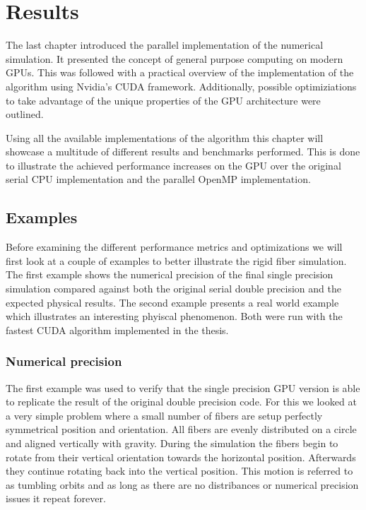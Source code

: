 \documentclass[a4paper,11pt]{kth-mag}
\begin{document}
\chapter{Results}
\label{cha:results}

The last chapter introduced the parallel implementation of the numerical simulation. It presented the concept of general purpose computing on modern GPUs. This was followed with a practical overview of the implementation of the algorithm using Nvidia's CUDA framework. Additionally, possible optimiziations to take advantage of the unique properties of the GPU architecture were outlined.

Using all the available implementations of the algorithm this chapter will showcase a multitude of different results and benchmarks performed. This is done to illustrate the achieved performance increases on the GPU over the original serial CPU implementation and the parallel OpenMP implementation.

\section{Examples}

Before examining the different performance metrics and optimizations we will first look at a couple of examples to better illustrate the rigid fiber simulation. The first example shows the numerical precision of the final single precision simulation compared against both the original serial double precision and the expected physical results. The second example presents a real world example which illustrates an interesting phyiscal phenomenon. Both were run with the fastest CUDA algorithm implemented in the thesis.

\subsection{Numerical precision}
\label{subsec:example_sphere}

The first example was used to verify that the single precision GPU version is able to replicate the result of the original double precision code. For this we looked at a very simple problem where a small number of fibers are setup perfectly symmetrical position and orientation. All fibers are evenly distributed on a circle and aligned vertically with gravity. During the simulation the fibers begin to rotate from their vertical orientation towards the horizontal position. Afterwards they continue rotating back into the vertical position. This motion is referred to as tumbling orbits and as long as there are no distribances or numerical precision issues it repeat forever.
\end{document}
